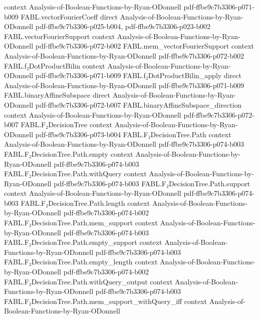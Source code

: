 \begin{theorem}
  {context}
  {Analysis-of-Boolean-Functions-by-Ryan-ODonnell}
  {pdf-ffbe9c7b3306-p071-b009}
\proofstep
  {FABL.vectorFourierCoeff}
  {direct}
  {Analysis-of-Boolean-Functions-by-Ryan-ODonnell}
  {pdf-ffbe9c7b3306-p025-b004,
    pdf-ffbe9c7b3306-p023-b002}
\proofstep
  {FABL.vectorFourierSupport}
  {context}
  {Analysis-of-Boolean-Functions-by-Ryan-ODonnell}
  {pdf-ffbe9c7b3306-p072-b002}
\proofstep
  {FABL.mem_vectorFourierSupport}
  {context}
  {Analysis-of-Boolean-Functions-by-Ryan-ODonnell}
  {pdf-ffbe9c7b3306-p072-b002}
\proofstep
  {FABL.f₂DotProductBilin}
  {context}
  {Analysis-of-Boolean-Functions-by-Ryan-ODonnell}
  {pdf-ffbe9c7b3306-p071-b009}
\proofstep
  {FABL.f₂DotProductBilin_apply}
  {direct}
  {Analysis-of-Boolean-Functions-by-Ryan-ODonnell}
  {pdf-ffbe9c7b3306-p071-b009}
\proofstep
  {FABL.binaryAffineSubspace}
  {direct}
  {Analysis-of-Boolean-Functions-by-Ryan-ODonnell}
  {pdf-ffbe9c7b3306-p072-b007}
\proofstep
  {FABL.binaryAffineSubspace_direction}
  {context}
  {Analysis-of-Boolean-Functions-by-Ryan-ODonnell}
  {pdf-ffbe9c7b3306-p072-b007}
\proofstep
  {FABL.F₂DecisionTree}
  {context}
  {Analysis-of-Boolean-Functions-by-Ryan-ODonnell}
  {pdf-ffbe9c7b3306-p073-b004}
\proofstep
  {FABL.F₂DecisionTree.Path}
  {context}
  {Analysis-of-Boolean-Functions-by-Ryan-ODonnell}
  {pdf-ffbe9c7b3306-p074-b003}
\proofstep
  {FABL.F₂DecisionTree.Path.empty}
  {context}
  {Analysis-of-Boolean-Functions-by-Ryan-ODonnell}
  {pdf-ffbe9c7b3306-p074-b003}
\proofstep
  {FABL.F₂DecisionTree.Path.withQuery}
  {context}
  {Analysis-of-Boolean-Functions-by-Ryan-ODonnell}
  {pdf-ffbe9c7b3306-p074-b003}
\proofstep
  {FABL.F₂DecisionTree.Path.support}
  {context}
  {Analysis-of-Boolean-Functions-by-Ryan-ODonnell}
  {pdf-ffbe9c7b3306-p074-b003}
\proofstep
  {FABL.F₂DecisionTree.Path.length}
  {context}
  {Analysis-of-Boolean-Functions-by-Ryan-ODonnell}
  {pdf-ffbe9c7b3306-p074-b002}
\proofstep
  {FABL.F₂DecisionTree.Path.mem_support}
  {context}
  {Analysis-of-Boolean-Functions-by-Ryan-ODonnell}
  {pdf-ffbe9c7b3306-p074-b003}
\proofstep
  {FABL.F₂DecisionTree.Path.empty_support}
  {context}
  {Analysis-of-Boolean-Functions-by-Ryan-ODonnell}
  {pdf-ffbe9c7b3306-p074-b003}
\proofstep
  {FABL.F₂DecisionTree.Path.empty_length}
  {context}
  {Analysis-of-Boolean-Functions-by-Ryan-ODonnell}
  {pdf-ffbe9c7b3306-p074-b002}
\proofstep
  {FABL.F₂DecisionTree.Path.withQuery_output}
  {context}
  {Analysis-of-Boolean-Functions-by-Ryan-ODonnell}
  {pdf-ffbe9c7b3306-p074-b003}
\proofstep
  {FABL.F₂DecisionTree.Path.mem_support_withQuery_iff}
  {context}
  {Analysis-of-Boolean-Functions-by-Ryan-ODonnell}

\end{theorem}
